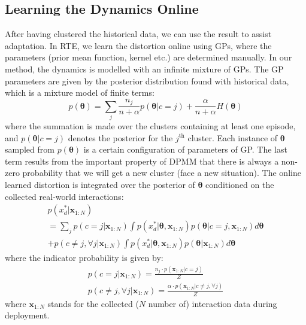 \subsection{Learning the Dynamics Online}
After having clustered the historical data, we can use the result to assist adaptation.
In RTE, we learn the distortion online using GPs, where the parameters (prior mean function, kernel etc.) are determined manually.
In our method, the dynamics is modelled with an infinite mixture of GPs. 
The GP parameters are given by the posterior distribution found with historical data, which is a mixture model of finite terms:
\begin{equation}
p(\bm{\theta}) = \sum_j \frac{n_j}{n + \alpha} p(\bm{\theta}|c=j) 
+ \frac{\alpha}{n + \alpha} H(\bm{\theta})
\label{trained_mixture_model}
\end{equation}
where the summation is made over the clusters containing at least one episode, and $p(\bm{\theta}|c=j)$ denotes the posterior for the $j^{\text{th}}$ cluster.
Each instance of $\bm{\theta}$ sampled from $p(\bm{\theta})$ is a certain configuration of parameters of GP.
The last term results from the important property of DPMM that there is always a non-zero probability that we will get a new cluster (face a new situation).
The online learned distortion is integrated over the posterior of $\bm{\theta}$ conditioned on the collected real-world interactions:
\begin{equation}
\begin{gathered}
p(x^*_d|\bm{x}_{1:N}) 
\\
= \sum_j p(c=j| \bm{x}_{1:N}) \int p(x^*_d|\bm{\theta}, \bm{x}_{1:N})p(\bm{\theta}|c=j, \bm{x}_{1:N}) d\bm{\theta} 
\\
+ p(c \neq j, \forall j|\bm{x}_{1:N}) \int p(x^*_d|\bm{\theta}, \bm{x}_{1:N}) p(\bm{\theta} | \bm{x}_{1:N}) d\bm{\theta}
\end{gathered}
\label{MGP_posterior}
\end{equation}
where the indicator probability is given by:
\begin{equation}
\begin{gathered}
p(c=j| \bm{x}_{1:N}) 
= \frac{n_j \cdot p(\bm{x}_{1:N}|c=j)
}{Z}
\\ 
p(c \neq j, \forall j| \bm{x}_{1:N})
= \frac{\alpha \cdot p(\bm{x}_{1:N}|c \neq j, \forall j)
}{Z}
\end{gathered}
\label{MGP_indicator}
\end{equation}
where $\bm{x}_{1:N}$ stands for the collected ($N$ number of) interaction data during deployment.
